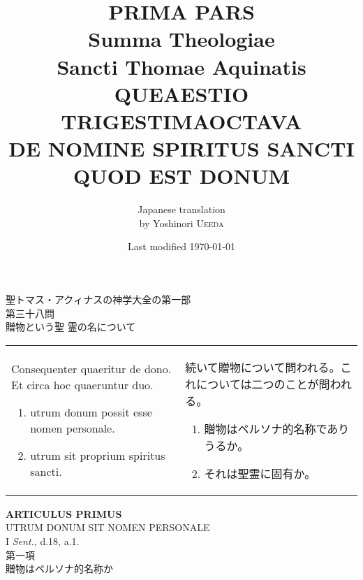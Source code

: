 \documentclass[10pt]{jsarticle} %
\title{{\bf PRIMA PARS}\\{\Huge Summa Theologiae}\\Sancti Thomae
    Aquinatis\\{\sffamily QUEAESTIO TRIGESTIMAOCTAVA}\\DE NOMINE SPIRITUS
SANCTI QUOD EST DONUM}
\author{Japanese translation\\by Yoshinori {\scshape Ueeda}}
\date{Last modified \today}
\begin{document}
\maketitle
\begin{center}
    {\Large 聖トマス・アクィナスの神学大全の第一部\\第三十八問\\贈物という聖
    霊の名について}
\end{center}

\thispagestyle{empty}
\begin{longtable}{p{21em}p{21em}}

    Consequenter quaeritur de dono. Et circa hoc quaeruntur duo. 

    \begin{enumerate}
        \item utrum donum possit esse nomen personale.
        \item utrum sit proprium spiritus sancti.
    \end{enumerate}

&

続いて贈物について問われる。これについては二つのことが問われる。
\begin{enumerate}
    \item 贈物はペルソナ的名称でありうるか。
    \item それは聖霊に固有か。
\end{enumerate}
\end{longtable}

\newpage

\begin{center}
    {\Large {\bf ARTICULUS PRIMUS}}\\
    {\large UTRUM DONUM SIT NOMEN PERSONALE}\\
    {\footnotesize I \textit{Sent.}, d.18, a.1.}\\
    {\Large 第一項\\贈物はペルソナ的名称か}
\end{center}
\end{document}
